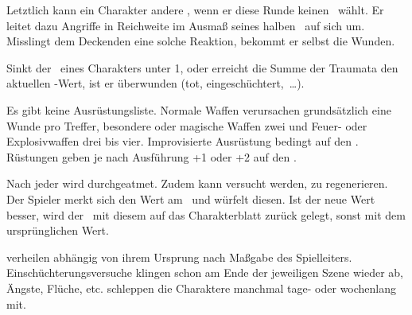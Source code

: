 {		Letztlich kann ein Charakter andere , wenn er diese Runde keinen \AD\ wählt. Er leitet dazu Angriffe in Reichweite im Ausmaß seines halben \RD\ auf sich um. Misslingt dem Deckenden eine solche Reaktion, bekommt er selbst die Wunden.

		Sinkt der \HD\ eines Charakters unter 1, oder erreicht die Summe der Traumata den aktuellen \HD-Wert, ist er überwunden (tot, eingeschüchtert,~\ldots).


		\noindent
		Es gibt keine Ausrüstungsliste. Normale Waffen verursachen grundsätzlich eine Wunde pro Treffer, besondere oder magische Waffen zwei und Feuer- oder Explosivwaffen drei bis vier. Improvisierte Ausrüstung bedingt  auf den \AD. Rüstungen geben je nach Ausführung +1 oder +2 auf den \RD.


		\noindent
		Nach jeder  wird durchgeatmet. Zudem kann versucht werden, zu regenerieren. Der Spieler merkt sich den Wert am \HD\ und würfelt diesen. Ist der neue Wert besser, wird der \HD\ mit diesem auf das Charakterblatt zurück gelegt, sonst mit dem ursprünglichen Wert.

		 verheilen abhängig von ihrem Ursprung nach Maßgabe des Spielleiters. Einschüchterungsversuche klingen schon am Ende der jeweiligen Szene wieder ab, Ängste, Flüche, etc. schleppen die Charaktere manchmal tage- oder wochenlang mit.
}

